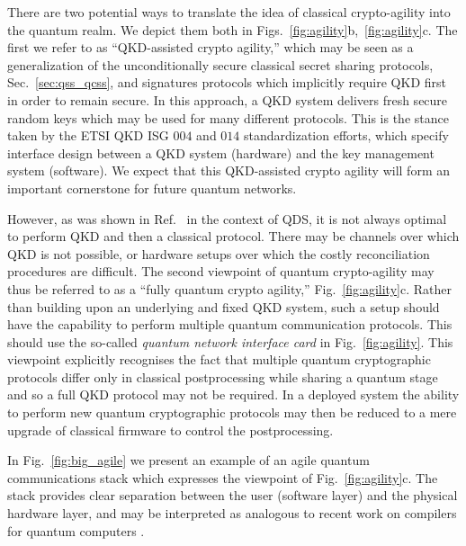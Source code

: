 There are two potential ways to translate the idea of classical crypto-agility into the quantum realm. We depict them both in Figs.~\ref{fig:agility}b,~\ref{fig:agility}c. The first we refer to as ``QKD-assisted crypto agility,'' which may be seen as a generalization of the unconditionally secure classical secret sharing protocols, Sec.~\ref{sec:qss_qcss}, and signatures protocols \cite{Wallden2015, Amiri2016a} which implicitly require QKD first in order to remain secure. In this approach, a QKD system delivers fresh secure random keys which may be used for many different protocols. This is the stance taken by the ETSI QKD ISG $004$ \cite{ETSI004} and $014$ \cite{ETSI014} standardization efforts, which specify interface design between a QKD system (hardware) and the key management system (software). We expect that this QKD-assisted crypto agility will form an important cornerstone for future quantum networks. %

However, as was shown in Ref.~\cite{Amiri2016} in the context of QDS, it is not always optimal to perform QKD and then a classical protocol. There may be channels over which QKD is not possible, or hardware setups over which the costly reconciliation procedures are difficult. The second viewpoint of quantum crypto-agility may thus be referred to as a ``fully quantum crypto agility,'' Fig.~\ref{fig:agility}c. Rather than building upon an underlying and fixed QKD system, such a setup should have the capability to perform multiple quantum communication protocols. This should use the so-called \emph{quantum network interface card} in Fig.~\ref{fig:agility}. This viewpoint explicitly recognises the fact that multiple quantum cryptographic protocols differ only in classical postprocessing while sharing a quantum stage and so a full QKD protocol may not be required. %
In a deployed system the ability to perform new quantum cryptographic protocols may then be reduced to a mere upgrade of classical firmware to control the postprocessing.



In Fig.~\ref{fig:big_agile} we present an example of an agile quantum communications stack which expresses the viewpoint of Fig.~\ref{fig:agility}c. The stack provides clear separation between the user (software layer) and the physical hardware layer, and may be interpreted as analogous to recent work on compilers for quantum computers \cite{Killoran2018, qiskit, Murali2019}.

